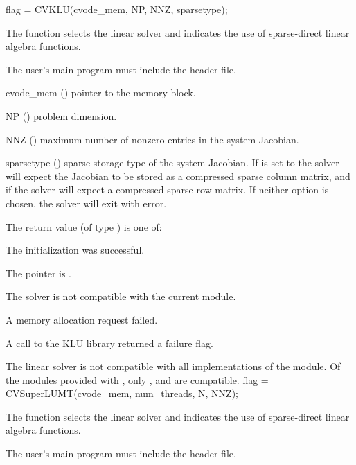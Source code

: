 {
  flag = CVKLU(cvode\_mem, NP, NNZ, sparsetype);
}
{
  The function  selects the {\cvklu} linear solver and indicates
  the use of sparse-direct linear algebra functions.

  The user's main program must include the  header file.
}
{
  \begin{args}
  \item[cvode\_mem] ()
    pointer to the {\cvodes} memory block.
  \item[NP] ()
    problem dimension.
  \item[NNZ] ()
    maximum number of nonzero entries in the system Jacobian.
  \item[sparsetype] ()
    sparse storage type of the system Jacobian. If  is  
    set to  the solver will expect the Jacobian to be stored as 
    a compressed sparse column matrix, and if  
    the solver will expect a compressed sparse row matrix. 
    If neither option is chosen, the solver will exit with error.
  \end{args}
}
{
  The return value  (of type ) is one of:
  \begin{args}
  \item[\Id{CVSLS\_SUCCESS}] 
    The {\cvklu} initialization was successful.
  \item[\Id{CVSLS\_MEM\_NULL}]
    The  pointer is .
  \item[\Id{CVSLS\_ILL\_INPUT}]
    The {\cvklu} solver is not compatible with the current {\nvector} module.
  \item[\Id{CVSLS\_MEM\_FAIL}]
    A memory allocation request failed.
  \item[\Id{CVSLS\_PACKAGE\_FAIL}]
    A call to the KLU library returned a failure flag.
  \end{args}
}
{
  The {\cvklu} linear solver is not compatible with all
  implementations of the {\nvector} module. 
  Of the {\nvector} modules provided with {\sundials}, only {\nvecs},
  {\nvecopenmp} and {\nvecpthreads} are compatible.
}
{
  flag = CVSuperLUMT(cvode\_mem, num\_threads, N, NNZ);
}
{
  The function  selects the {\cvsuperlumt} linear
  solver and indicates the use of sparse-direct linear
  algebra functions.

  The user's main program must include the  header file.
}
